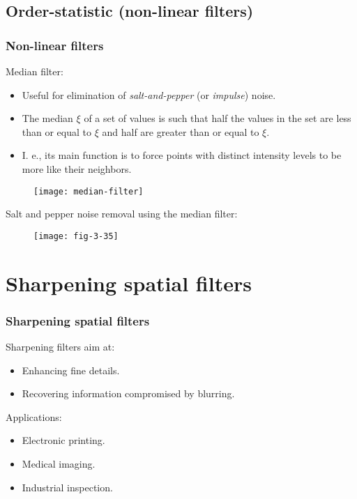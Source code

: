 
\subsection{Order-statistic (non-linear filters)}


\begin{frame}
\frametitle{Non-linear filters}
Median filter:
\begin{itemize}
\item Useful for elimination of \textit{salt-and-pepper} (or \textit{impulse}) noise.
\item The median $\xi$ of a set of values is such that half the values in the set are less than or equal to $\xi$ and half are greater than or equal to $\xi$.
\item I. e., its main function is to force points with distinct intensity levels to be more like their neighbors.
\end{itemize}
\begin{figure}
\centering
\texttt{[image: median-filter]}
\end{figure}
\end{frame}


\begin{frame}
Salt and pepper noise removal using the median filter:
\begin{figure}
\centering
\texttt{[image: fig-3-35]}
\end{figure}
\end{frame}


\section{Sharpening spatial filters}


\begin{frame}
\frametitle{Sharpening spatial filters}
Sharpening filters aim at:
\begin{itemize}
\item Enhancing fine details.
\item Recovering information compromised by blurring.
\end{itemize}
Applications:
\begin{itemize}
\item Electronic printing.
\item Medical imaging.
\item Industrial inspection.
\end{itemize}
\end{frame}

